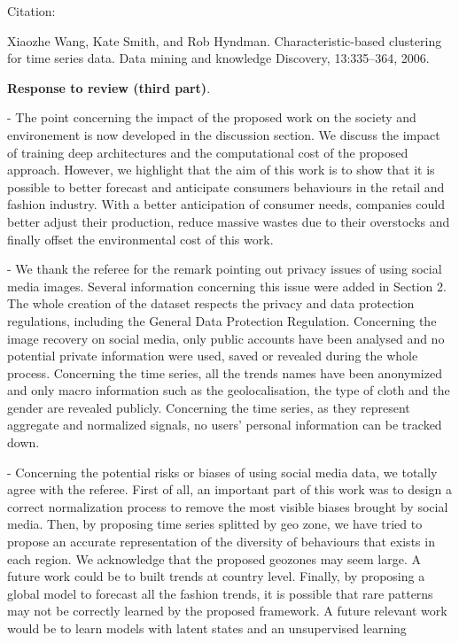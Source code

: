 \documentclass[10pt]{article} %
\begin{document}
Citation:

Xiaozhe Wang, Kate Smith, and Rob Hyndman. Characteristic-based clustering for time series data. Data mining and knowledge Discovery, 13:335–364, 2006.

\textbf{Response to review (third part)}.\vspace{0.2cm}

- The point concerning the impact of the proposed work on the society and environement is now developed in the discussion section. We discuss the impact of training deep architectures and the computational cost of the proposed approach. However, we highlight that the aim of this work is to show that it is possible to better forecast and anticipate consumers behaviours in the retail and fashion industry. With a better anticipation of consumer needs, companies could better adjust their production, reduce massive wastes due to their overstocks and finally offset the environmental cost of this work.
	
- We thank the referee for the remark pointing out privacy issues of using social media images. Several information concerning this issue were added in Section 2. The whole creation of the dataset respects the privacy and data protection regulations, including the General Data Protection Regulation. Concerning the image recovery on social media, only public accounts have been analysed and no potential private information were used, saved or revealed during the whole process. Concerning the time series, all the trends names have been anonymized and only macro information such as the geolocalisation, the type of cloth and the gender are revealed publicly. Concerning the time series, as they represent aggregate and normalized signals, no users' personal information can be tracked down.
	
- Concerning the potential risks or biases of using social media data, we totally agree with the referee. First of all, an important part of this work was to design a correct normalization process to remove the most visible biases brought by social media. Then, by proposing time series splitted by geo zone, we have tried to propose an accurate representation of the diversity of behaviours that exists in each region. We acknowledge that the proposed geozones may seem large. A future work could be to built trends at country level. Finally, by proposing a global model to forecast all the fashion trends, it is possible that rare patterns may not be correctly learned by the proposed framework. A future relevant work would be to learn models with latent states and an unsupervised learning
\end{document}
